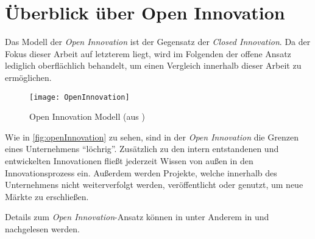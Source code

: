 \section{Überblick über Open Innovation}\label{sec:grundlagen-open}

Das Modell der \textit{Open Innovation} ist der Gegensatz der \textit{Closed Innovation}.
Da der Fokus dieser Arbeit auf letzterem liegt,
wird im Folgenden der offene Ansatz lediglich oberflächlich behandelt,
um einen Vergleich innerhalb dieser Arbeit zu ermöglichen.

\begin{figure}[ht!]
    \centering
    \texttt{[image: OpenInnovation]}
    \caption{Open Innovation Modell (aus \cite[23]{herzog2011})}
    \label{fig:openInnovation}
\end{figure}

Wie in \autoref{fig:openInnovation} zu sehen,
sind in der \textit{Open Innovation} die Grenzen eines Unternehmens \enquote{löchrig}.
Zusätzlich zu den intern entstandenen und entwickelten Innovationen
fließt jederzeit Wissen von außen in den Innovationsprozess ein.
Außerdem werden Projekte, welche innerhalb des Unternehmens nicht weiterverfolgt werden,
veröffentlicht oder genutzt, um neue Märkte zu erschließen.

Details zum \textit{Open Innovation}-Ansatz können in unter Anderem
in \cite[60\psqq]{chesbrough2003} und \cite[21\psqq]{herzog2011} nachgelesen werden.